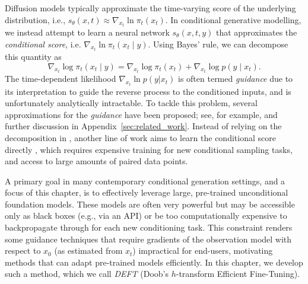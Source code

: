 
Diffusion models typically approximate the time-varying score of the underlying distribution, i.e., $s_{\theta}(x, t) \approx \nabla_{x_t} \ln \pi_t(x_t)$. In conditional generative modelling, we instead attempt to learn a neural network $s_\theta(x, t, y)$ that approximates the \emph{conditional score}, i.e. $\nabla_{x_t} \ln \pi_t(x_t \mid y)$. Using Bayes' rule, we can decompose this quantity as
\[
\nabla_{x_t} \log \pi_t(x_t \mid y)=\nabla_{x_t} \log \pi_t(x_t)+\nabla_{x_t} \log p\left(y \mid x_t\right). \label{eq:bayes_theorem_deft}
\]
The time-dependent likelihood $\nabla_{x_t} \ln p(y | x_t)$ is often termed \textit{guidance} due to its interpretation to guide the reverse process to the conditioned inputs, and is unfortunately analytically intractable\label{ntn:guidance}. To tackle this problem, several approximations for the \textit{guidance} have been proposed; see, for example, \textcite{chung2022diffusion,finzi2023user,jalal2021robust,rout2024solving,song2022pseudoinverse,song2021solving} and further discussion in Appendix~\ref{sec:related_work}. Instead of relying on the decomposition in , another line of work aims to learn the conditional score directly \citep{batzolis2021conditional,ho2022classifier}, which requires expensive training for new conditional sampling tasks, and access to large amounts of paired data points.

A primary goal in many contemporary conditional generation settings, and a focus of this chapter, is to effectively leverage large, pre-trained unconditional foundation models. These models are often very powerful but may be accessible only as black boxes (e.g., via an API) or be too computationally expensive to backpropagate through for each new conditioning task. This constraint renders some guidance techniques that require gradients of the observation model with respect to $x_0$ (as estimated from $x_t$) impractical for end-users, motivating methods that can adapt pre-trained models efficiently. In this chapter, we develop such a method, which we call \emph{DEFT} (Doob's $h$-transform Efficient Fine-Tuning).

